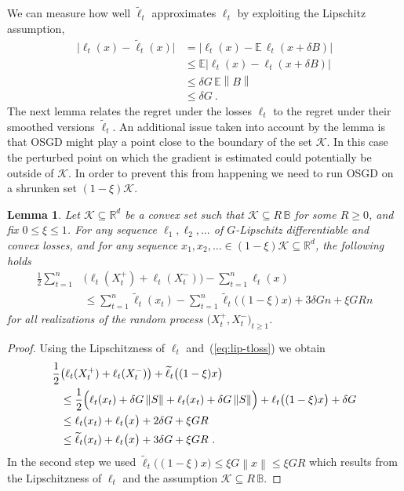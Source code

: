 \documentclass[11pt]{hackednow}
\newtheorem{lemma}{Lemma}[chapter]
\newcommand{\E}{\mathbb{E}}
\newcommand{\R}{\mathbb{R}}
\newcommand{\cK}{\mathcal{K}}
\newcommand{\Ball}{\mathbb{B}}
\newcommand{\norm}[1]{\left\|{#1}\right\|}
\newcommand{\tloss}{\widetilde{\ell}}
\begin{document}
We can measure how well $\tloss_t$ approximates $\ell_t$ by exploiting the Lipschitz assumption,
\begin{align}
\nonumber
    \bigl|\ell_t(x) - \tloss_t(x)\bigr|
&=
    \bigl|\ell_t(x) - \E\,\ell_t(x + \delta B)\bigr|
\\ &\le
\nonumber
    \E\bigl|\ell_t(x) - \ell_t(x + \delta B)\bigr|
\\ &\le
\nonumber
    \delta G\,\E\norm{B}
\\ &\le
\label{eq:lip-tloss}
    \delta G~.
\end{align}
The next lemma relates the regret under the losses $\ell_t$ to the regret under their smoothed versions $\tloss_t$. An additional issue taken into account by the lemma is that OSGD might play a point close to the boundary of the set $\cK$. In this case the perturbed point on which the gradient is estimated could potentially be outside of $\cK$. In order to prevent this from happening we need to run OSGD on a shrunken set $(1-\xi)\cK$.
\begin{lemma}
\label{l:two-point}
Let $\cK\subseteq\R^d$ be a convex set such that $\cK\subseteq R\,\Ball$ for some $R \ge 0$, and fix $0 \le \xi \le 1$.
For any sequence $\ell_1,\ell_2,\dots$ of $G$-Lipschitz differentiable and convex losses, and for any sequence $x_1,x_2,\ldots\in (1-\xi)\cK \subseteq\R^d$, the following holds
\begin{align*}
    \frac{1}{2}\sum_{t=1}^n &\bigl(\ell_t(X_t^+) + \ell_t(X_t^-)\bigr) - \sum_{t=1}^n \ell_t(x)
\\& \le
    \sum_{t=1}^n \tloss_t(x_t) - \sum_{t=1}^n \tloss_t\bigl((1-\xi)x\bigr) + 3\delta G n + \xi GR n
\end{align*}
for all realizations of the random process $\bigl(X_t^+,X_t^-\bigr)_{t \ge 1}$.
\end{lemma}
\begin{proof}
Using the Lipschitzness of $\ell_t$ and~(\ref{eq:lip-tloss}) we obtain
\begin{align*}
    \frac{1}{2} &\bigl(\ell_t(X_t^+) + \ell_t(X_t^-)\bigr) + \tloss_t\bigl((1-\xi)x\bigr)
\\ &\le
    \frac{1}{2} \Bigl(\ell_t(x_t) + \delta G \norm{S} + \ell_t(x_t) + \delta G \norm{S} \Bigr) + \ell_t\bigl((1-\xi)x\bigr) + \delta G
\\ &\le
    \ell_t(x_t) + \ell_t\bigl(x\bigr) + 2\delta G + \xi GR
\\ &\le
    \tloss_t(x_t) + \ell_t\bigl(x\bigr) + 3\delta G + \xi GR~.
\end{align*}
In the second step we used $\tloss_t\bigl((1-\xi)x\bigr) \le \xi G\norm{x} \le \xi GR$ which results from the Lipschitzness of $\ell_t$ and the assumption $\cK\subseteq R\,\Ball$.
\end{proof}
\end{document}
